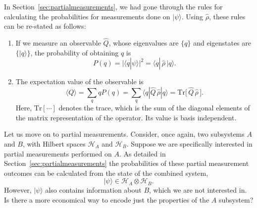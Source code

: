 \documentclass[prx,12pt]{revtex4-2}
\begin{document}
In Section~\ref{sec:partialmeasurements}, we had gone through the
rules for calculating the probabilities for measurements done on
$|\psi\rangle$.  Using $\hat{\rho}$, these rules can be re-stated as
follows:

\begin{enumerate}
\item If we measure an observable $\hat{Q}$, whose eigenvalues are
  $\{q\}$ and eigenstates are $\{|q\rangle\}$, the probability of
  obtaining $q$ is
  \begin{equation}
    P(q) = \big|\langle q | \psi\rangle\big|^2 =
    \langle q |\, \hat{\rho}\, | q \rangle.
    \label{Pi_rho}
  \end{equation}

\item The expectation value of the observable is
  \begin{equation}
    \langle Q\rangle
    = \sum_q q P(q)
    = \sum_q \langle q | \hat{Q}\, \hat{\rho}| q \rangle
    = \mathrm{Tr}\big[\,\hat{Q} \, \hat{\rho}\,\big].
    \label{Qexpt}
  \end{equation}
  Here, $\mathrm{Tr}[\cdots]$ denotes the trace, which is the sum of
  the diagonal elements of the matrix representation of the operator.
  Its value is basis independent.
\end{enumerate}

Let us move on to partial measurements.  Consider, once again, two
subsystems $A$ and $B$, with Hilbert spaces $\mathscr{H}_A$ and
$\mathscr{H}_B$.  Suppose we are specifically interested in partial
measurements performed on $A$.  As detailed in
Section~\ref{sec:partialmeasurements} the probabilities of these
partial measurement outcomes can be calculated from the state of the
combined system,
\begin{equation*}
  |\psi\rangle \in \mathscr{H}_A\otimes \mathscr{H}_B.
\end{equation*}
However, $|\psi\rangle$ also contains information about $B$, which we
are not interested in.  Is there a more economical way to encode just
the properties of the $A$ subsystem?
\end{document}
